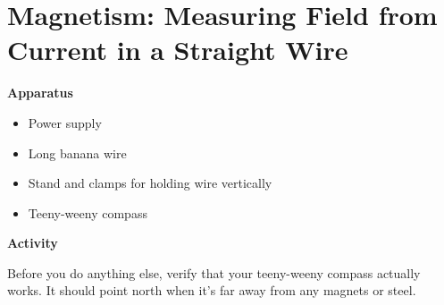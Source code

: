 
\section{Magnetism: Measuring Field from Current in a Straight Wire}

\makelabheader %


\bigskip
\textbf{Apparatus} 

\begin{itemize} [nosep]
\item Power supply
\item Long banana wire 
\item Stand and clamps for holding wire vertically
\item Teeny-weeny compass
\end{itemize}

\bigskip
\textbf{Activity}

Before you do anything else, verify that your teeny-weeny compass actually works.  It should point north when it's far away from any magnets or steel.  

